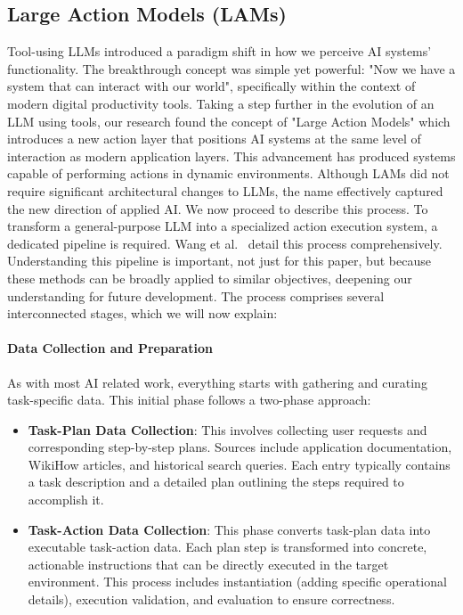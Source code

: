 \documentclass[journal,twoside,10pt]{IEEEtran}
\begin{document}
\subsection{Large Action Models (LAMs)}
Tool-using LLMs introduced a paradigm shift in how we perceive AI systems' functionality. The breakthrough concept was simple yet powerful: "Now we have a system that can interact with our world", specifically within the context of modern digital productivity tools. Taking a step further in the evolution of  an LLM using tools, our research found the concept of "Large Action Models" which introduces a new action layer that positions AI systems at the same level of interaction as modern application layers. This advancement has produced systems capable of performing actions in dynamic environments. Although LAMs did not require significant architectural changes to LLMs, the name effectively captured the new direction of applied AI. We now proceed to describe this process.
To transform a general-purpose LLM into a specialized action execution system, a dedicated pipeline is required. Wang et al.~\cite{wang2025lam} detail this process comprehensively. Understanding this pipeline is important, not just for this paper, but because these methods can be broadly applied to similar objectives, deepening our understanding for future development. The process comprises several interconnected stages, which we will now explain:

\paragraph{Data Collection and Preparation}
As with most AI related work, everything starts with gathering and curating task-specific data. This initial phase follows a two-phase approach:

\begin{itemize}
    \item \textbf{Task-Plan Data Collection}: This involves collecting user requests and corresponding step-by-step plans. Sources include application documentation, WikiHow articles, and historical search queries. Each entry typically contains a task description and a detailed plan outlining the steps required to accomplish it.
    
    \item \textbf{Task-Action Data Collection}: This phase converts task-plan data into executable task-action data. Each plan step is transformed into concrete, actionable instructions that can be directly executed in the target environment. This process includes instantiation (adding specific operational details), execution validation, and evaluation to ensure correctness.
\end{itemize}
\end{document}
